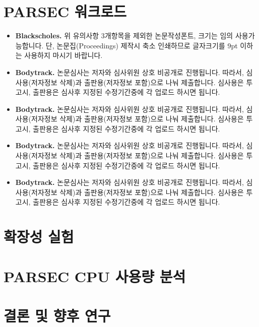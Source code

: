 \documentclass{kcc}
\begin{document}
\section{PARSEC 워크로드}
\begin{itemize}
    \item \textbf{Blackscholes.} 위 유의사항 3개항목을 제외한 논문작성폰트, 크기는 임의 사용가능합니다. 
    단, 논문집(Proceedings) 제작시 축소 인쇄하므로 글자크기를 9pt 이하는 사용하지 마시기 바랍니다.
    \item \textbf{Bodytrack.} 논문심사는 저자와 심사위원 상호 비공개로 진행됩니다. 
    따라서, 심사용(저자정보 삭제)과 출판용(저자정보 포함)으로 나눠 제출합니다. 
    심사용은 투고시, 출판용은 심사후 지정된 수정기간중에 각 업로드 하시면 됩니다. 
    \item \textbf{Bodytrack.} 논문심사는 저자와 심사위원 상호 비공개로 진행됩니다. 
    따라서, 심사용(저자정보 삭제)과 출판용(저자정보 포함)으로 나눠 제출합니다. 
    심사용은 투고시, 출판용은 심사후 지정된 수정기간중에 각 업로드 하시면 됩니다. 
    \item \textbf{Bodytrack.} 논문심사는 저자와 심사위원 상호 비공개로 진행됩니다. 
    따라서, 심사용(저자정보 삭제)과 출판용(저자정보 포함)으로 나눠 제출합니다. 
    심사용은 투고시, 출판용은 심사후 지정된 수정기간중에 각 업로드 하시면 됩니다. 
    \item \textbf{Bodytrack.} 논문심사는 저자와 심사위원 상호 비공개로 진행됩니다. 
    따라서, 심사용(저자정보 삭제)과 출판용(저자정보 포함)으로 나눠 제출합니다. 
    심사용은 투고시, 출판용은 심사후 지정된 수정기간중에 각 업로드 하시면 됩니다. 
\end{itemize}

\section{확장성 실험}

\section{PARSEC CPU 사용량 분석}



\section{결론 및 향후 연구}



\end{document}
